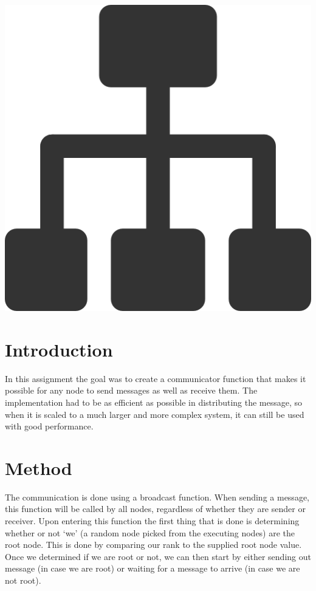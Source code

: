 \documentclass[a4paper,12px]{article}
\begin{document}
\vspace{2cm}
\begin{center}
    \includegraphics[width=(\textwidth/5*3)]{parallel_tasks}
\end{center}
\clearpage

\tableofcontents
\vspace{5mm}


\section{Introduction}

In this assignment the goal was to create a communicator function that makes it
possible for any node to send messages as well as receive them. The
implementation had to be as efficient as possible in distributing the message,
so when it is scaled to a much larger and more complex system, it can still be
used with good performance.

\section{Method}

The communication is done using a broadcast function. When sending a message,
this function will be called by all nodes, regardless of whether they are sender
or receiver. Upon entering this function the first thing that is done is
determining whether or not `we' (a random node picked from the executing nodes)
are the root node. This is done by comparing our rank to the supplied root node
value. Once we determined if we are root or not, we can then start by either
sending out message (in case we are root) or waiting for a message to arrive (in
case we are not root).\\
\end{document}
